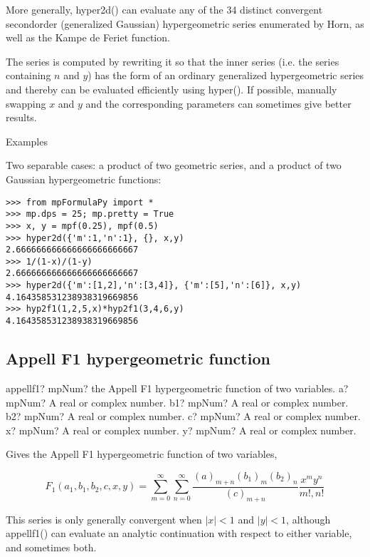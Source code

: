 More generally, hyper2d() can evaluate any of the 34 distinct convergent secondorder (generalized Gaussian) hypergeometric series enumerated by Horn, as well as the Kampe de Feriet function.

The series is computed by rewriting it so that the inner series (i.e. the series containing $n$ and $y$) has the form of an ordinary generalized hypergeometric series and thereby can be evaluated efficiently using hyper(). If possible, manually swapping $x$ and $y$
and the corresponding parameters can sometimes give better results.

Examples

Two separable cases: a product of two geometric series, and a product of two Gaussian hypergeometric functions:

\begin{lstlisting}
>>> from mpFormulaPy import *
>>> mp.dps = 25; mp.pretty = True
>>> x, y = mpf(0.25), mpf(0.5)
>>> hyper2d({'m':1,'n':1}, {}, x,y)
2.666666666666666666666667
>>> 1/(1-x)/(1-y)
2.666666666666666666666667
>>> hyper2d({'m':[1,2],'n':[3,4]}, {'m':[5],'n':[6]}, x,y)
4.164358531238938319669856
>>> hyp2f1(1,2,5,x)*hyp2f1(3,4,6,y)
4.164358531238938319669856
\end{lstlisting}




\subsection{Appell F1 hypergeometric function}

\begin{mpFunctionsExtract}
	\mpFunctionSix
	{appellf1? mpNum? the Appell F1 hypergeometric function of two variables.}
	{a? mpNum? A real or complex number.}
	{b1? mpNum? A real or complex number.}	
	{b2? mpNum? A real or complex number.}
	{c? mpNum? A real or complex number.}	
	{x? mpNum? A real or complex number.}		
	{y? mpNum? A real or complex number.}		
\end{mpFunctionsExtract}

\vpara
Gives the Appell F1 hypergeometric function of two variables,

\begin{equation}
F_1(a_1,b_1,b_2,c,x,y) = \sum_{m=0}^{\infty} \sum_{n=0}^{\infty} \frac{(a)_{m+n}(b_1)_m (b_2)_n}{(c)_{m+n}} \frac{x^my^n}{m!,n!}
\end{equation}


This series is only generally convergent when $|x|<1$ and $|y|<1$, although appellf1() can evaluate an analytic continuation with respect to either variable, and sometimes both.

